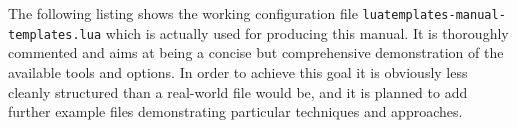 \documentclass{scrartcl}
\begin{document}
The following listing shows the working configuration file
\texttt{luatemplates-manual-templates.lua} which is actually used for producing
this manual. It is thoroughly commented and aims at being a concise but
comprehensive demonstration of the available tools and options.  In order to
achieve this goal it is obviously less cleanly structured than a real-world file
would be, and it is planned to add further example files demonstrating
particular techniques and approaches.

\inputminted[firstline=11]{lua}{luatemplates-manual-templates.lua}

\enlargethispage*{4\baselineskip}
\end{document}
